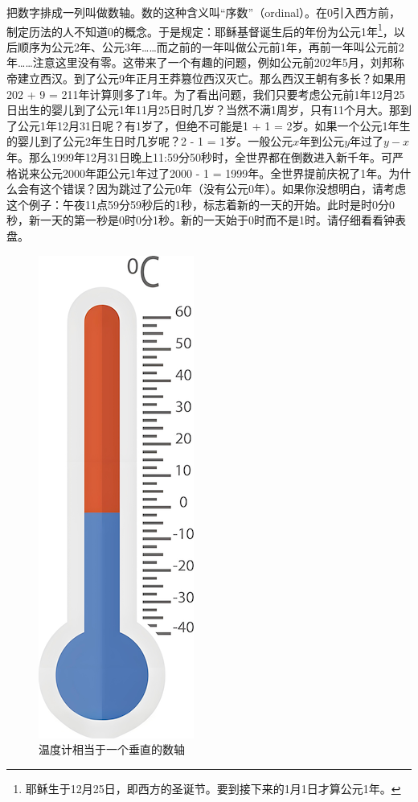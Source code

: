 \documentclass[b5paper]{ctexart}
\begin{document}
把数字排成一列叫做数轴。数的这种含义叫“序数”（ordinal）。在0引入西方前，制定历法的人不知道0的概念。于是规定：耶稣基督诞生后的年份为公元1年\footnote{耶稣生于12月25日，即西方的圣诞节。要到接下来的1月1日才算公元1年。}，以后顺序为公元2年、公元3年……而之前的一年叫做公元前1年，再前一年叫公元前2年……注意这里没有零。这带来了一个有趣的问题，例如公元前202年5月，刘邦称帝建立西汉。到了公元9年正月王莽篡位西汉灭亡。那么西汉王朝有多长？如果用202 + 9 = 211年计算则多了1年。为了看出问题，我们只要考虑公元前1年12月25日出生的婴儿到了公元1年11月25日时几岁？当然不满1周岁，只有11个月大。那到了公元1年12月31日呢？有1岁了，但绝不可能是1 + 1 = 2岁。如果一个公元1年生的婴儿到了公元2年生日时几岁呢？2 - 1 = 1岁。一般公元$x$年到公元$y$年过了$y - x$年。那么1999年12月31日晚上11:59分50秒时，全世界都在倒数进入新千年。可严格说来公元2000年距公元1年过了2000 - 1 = 1999年。全世界提前庆祝了1年。为什么会有这个错误？因为跳过了公元0年（没有公元0年）。如果你没想明白，请考虑这个例子：午夜11点59分59秒后的1秒，标志着新的一天的开始。此时是时0分0秒，新一天的第一秒是0时0分1秒。新的一天始于0时而不是1时。请仔细看看钟表盘。

\begin{figure}[htbp]
 \centering
 \includegraphics[scale=0.35]{img/thermometer}
 \caption{温度计相当于一个垂直的数轴}
 \label{fig:thermometer}
\end{figure}
\end{document}
